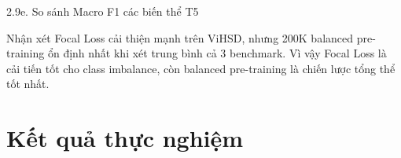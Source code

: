 \documentclass[11pt, aspectratio=169]{beamer}
\begin{document}
\begin{frame}[shrink=8]{2.9e. So sánh Macro F1 các biến thể T5}

\begin{table}[h]
  \centering
  \caption{Macro F1 trên 3 bộ dữ liệu downstream}
  \vspace{0.15cm}
\end{table}

\vspace{0.2cm}
\begin{block}{Nhận xét}
  Focal Loss cải thiện mạnh trên ViHSD, nhưng 200K balanced pre-training ổn định nhất khi xét trung bình cả 3 benchmark. Vì vậy Focal Loss là cải tiến tốt cho class imbalance, còn balanced pre-training là chiến lược tổng thể tốt nhất.
\end{block}
\end{frame}

\section{Kết quả thực nghiệm}
\end{document}
